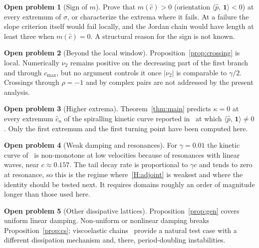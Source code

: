 \documentclass[11pt]{article}
\theoremstyle{plain}
\theoremstyle{definition}
\newtheorem{openproblem}{Open problem}
\theoremstyle{remark}
\newcommand{\ip}[2]{\langle #1,\,#2\rangle}
\newcommand{\ph}{\hat p}
\newcommand{\one}{\mathbf 1}
\newcommand{\cmax}{c_{\max}}
\begin{document}
\begin{openproblem}[Sign of $m$]\label{op:m}
Prove that $m(\hat c)>0$ (orientation $\ip{\ph}{\one}<0$) at every extremum of $\sigma$, or
characterize the extrema where it fails. At a failure the slope criterion itself would fail
locally, and the Jordan chain would have length at least three when $m(\hat c)=0$. A
structural reason for the sign is not known.
\end{openproblem}

\begin{openproblem}[Beyond the local window]\label{op:global}
Proposition~\ref{prop:crossing} is local. Numerically $\nu_2$ remains positive on the
decreasing part of the first branch and through $\cmax$, but no argument controls it once
$|\nu_2|$ is comparable to $\gamma/2$. Crossings through $\rho=-1$ and by complex pairs are
not addressed by the present analysis.
\end{openproblem}

\begin{openproblem}[Higher extrema]\label{op:higher}
Theorem~\ref{thm:main} predicts $\kappa=0$ at every extremum $\hat c_n$ of the spiralling
kinetic curve reported in~\cite{VCKX20} at which $\ip{\ph}{\one}\neq0$. Only the first
extremum and the first turning point have been computed here.
\end{openproblem}

\begin{openproblem}[Weak damping and resonances]\label{op:resonance}
For $\gamma=0.01$ the kinetic curve of~\cite{VCKX20} is non-monotone at low velocities
because of resonances with linear waves, near $c\approx0.157$. The tail decay rate is
proportional to $\gamma c$ and tends to zero at resonance, so this is the regime
where~\ref{H:adjoint} is weakest and where the identity should be tested next. It requires
domains roughly an order of magnitude longer than those used here.
\end{openproblem}

\begin{openproblem}[Other dissipative lattices]\label{op:other}
Proposition~\ref{prop:gen} covers uniform linear damping. Non-uniform or nonlinear damping
breaks Proposition~\ref{prop:cs}; viscoelastic chains~\cite{Vai25} provide a natural test
case with a different dissipation mechanism and, there, period-doubling instabilities.
\end{openproblem}

\end{document}
